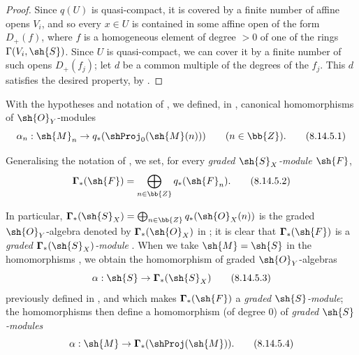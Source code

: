 \begin{proof}
Since $q(U)$ is quasi-compact, it is covered by a finite number of affine opens $V_i$, and so every $x\in U$ is contained in some affine open of the form $D_+(f)$, where $f$ is a homogeneous element of degree $>0$ of one of the rings $\Gamma(V_i,\sh{S})$.
Since $U$ is quasi-compact, we can cover it by a finite number of such opens $D_+(f_j)$;
let $d$ be a common multiple of the degrees of the $f_j$.
This $d$ satisfies the desired property, by .
\end{proof}

\begin{env}[8.14.5]
\label{II.8.14.5}
With the hypotheses and notation of , we defined, in , canonical homomorphisms of $\sh{O}_Y$-modules
\[
\label{II.8.14.5.1}
    \alpha_n: \sh{M}_n \to q_*(\shProj_0(\sh{M}(n)))
    \qquad (n\in\bb{Z}).
\tag{8.14.5.1}
\]

Generalising the notation of , we set, for every \emph{graded $\sh{S}_X$-module $\sh{F}$},
\[
\label{II.8.14.5.2}
    \boldsymbol{\Gamma}_*(\sh{F}) = \bigoplus_{n\in\bb{Z}}q_*(\sh{F}_n).
\tag{8.14.5.2}
\]

In particular, $\boldsymbol{\Gamma}_*(\sh{S}_X)=\bigoplus_{n\in\bb{Z}}q_*(\sh{O}_X(n))$ is the graded $\sh{O}_Y$-algebra denoted by $\boldsymbol{\Gamma}_*(\sh{O}_X)$ in ;
it is clear that $\boldsymbol{\Gamma}_*(\sh{F})$ is a \emph{graded $\boldsymbol{\Gamma}_*(\sh{S}_X)$-module} .
When
we take $\sh{M}=\sh{S}$ in the homomorphisms , we obtain the homomorphism of graded $\sh{O}_Y$-algebras
\[
\label{II.8.14.5.3}
    \alpha:\sh{S}\to\boldsymbol{\Gamma}_*(\sh{S}_X)
\tag{8.14.5.3}
\]
previously defined in , and which makes $\boldsymbol{\Gamma}_*(\sh{F})$ a \emph{graded $\sh{S}$-module};
the homomorphisms  then define a homomorphism (of degree $0$) of \emph{graded $\sh{S}$-modules}
\[
\label{II.8.14.5.4}
    \alpha:\sh{M}\to\boldsymbol{\Gamma}_*(\shProj(\sh{M})).
\tag{8.14.5.4}
\]
\end{env}

